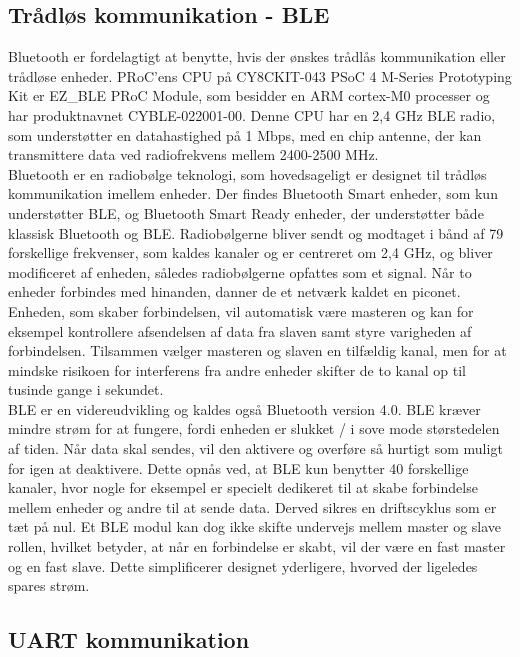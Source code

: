 \subsection{Trådløs kommunikation - BLE} 
Bluetooth er fordelagtigt at benytte, hvis der ønskes trådlås kommunikation eller trådløse enheder. PRoC'ens CPU på CY8CKIT-043 PSoC 4 M-Series Prototyping Kit er EZ\_BLE PRoC Module, som besidder en ARM cortex-M0 processer og har produktnavnet CYBLE-022001-00. Denne CPU har en 2,4 GHz BLE radio, som understøtter en datahastighed på 1 Mbps, med en chip antenne, der kan transmittere data ved radiofrekvens mellem 2400-2500 MHz. %
\citep{Semiconductor2016PRoC,Semiconductor2016BLEdyb}\\
Bluetooth er en radiobølge teknologi, som hovedsageligt er designet til trådløs kommunikation imellem enheder. Der findes Bluetooth Smart enheder, som kun understøtter BLE, og Bluetooth Smart Ready enheder, der understøtter både klassisk Bluetooth og BLE. Radiobølgerne bliver sendt og modtaget i bånd af 79 forskellige frekvenser, som kaldes kanaler og er centreret om 2,4 GHz, og bliver modificeret af enheden, således radiobølgerne opfattes som et signal. Når to enheder forbindes med hinanden, danner de et netværk kaldet en piconet. Enheden, som skaber forbindelsen, vil automatisk være masteren og kan for eksempel kontrollere afsendelsen af data fra slaven samt styre varigheden af forbindelsen. Tilsammen vælger masteren og slaven en tilfældig kanal, men for at mindske risikoen for interferens fra andre enheder skifter de to kanal op til tusinde gange i sekundet. \citep{CYPRESS2016workshopBLE,Sauter2011} \\
BLE er en videreudvikling og kaldes også Bluetooth version 4.0. BLE kræver mindre strøm for at fungere, fordi enheden er slukket / i sove mode størstedelen af tiden. Når data skal sendes, vil den aktivere og overføre så hurtigt som muligt for igen at deaktivere. Dette opnås ved, at BLE kun benytter 40 forskellige kanaler, hvor nogle for eksempel er specielt dedikeret til at skabe forbindelse mellem enheder og andre til at sende data. Derved sikres en driftscyklus som er tæt på nul. Et BLE modul kan dog ikke skifte undervejs mellem master og slave rollen, hvilket betyder, at når en forbindelse er skabt, vil der være en fast master og en fast slave. Dette simplificerer designet yderligere, hvorved der ligeledes spares strøm. \citep{Gupta2013}

\subsection{UART kommunikation} %
%
%
%
%
